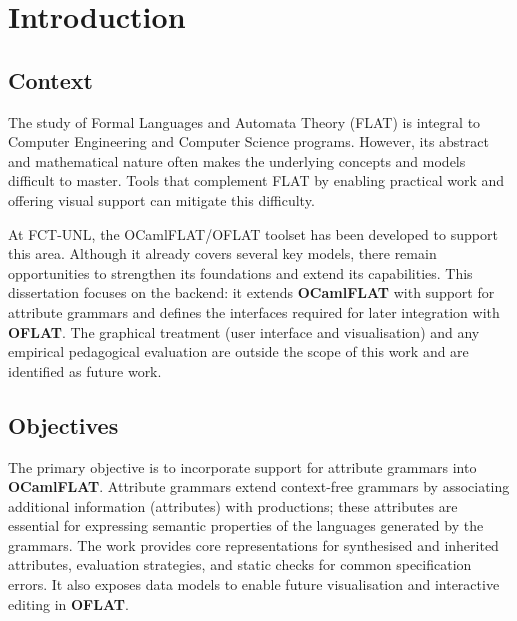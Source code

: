 
%

\chapter{Introduction}
\label{cha:introduction}


\section{Context}
\label{sec:context}

The study of Formal Languages and Automata Theory (FLAT) is integral to 
Computer Engineering and Computer Science programs. However, its abstract 
and mathematical nature often makes the underlying concepts and models 
difficult to master. Tools that complement FLAT by enabling practical work 
and offering visual support can mitigate this difficulty.

At FCT-UNL, the OCamlFLAT/OFLAT toolset has been developed to support this area. 
Although it already covers several key models, there remain opportunities to 
strengthen its foundations and extend its capabilities. This dissertation focuses 
on the backend: it extends \textbf{OCamlFLAT} with support for attribute grammars 
and defines the interfaces required for later integration with \textbf{OFLAT}. 
The graphical treatment (user interface and visualisation) and any empirical 
pedagogical evaluation are outside the scope of this work and are identified as 
future work.


\section{Objectives}
\label{sec:objectives}

The primary objective is to incorporate support for attribute grammars into 
\textbf{OCamlFLAT}. Attribute grammars extend context-free grammars by associating 
additional information (attributes) with productions; these attributes are essential 
for expressing semantic properties of the languages generated by the grammars. 
The work provides core representations for synthesised and inherited attributes, 
evaluation strategies, and static checks for common specification errors. It also 
exposes data models to enable future visualisation and interactive editing 
in \textbf{OFLAT}.


